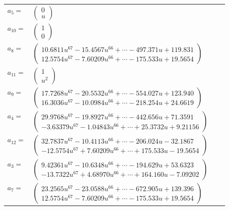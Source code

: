 \documentclass[1p]{elsarticle_modified}
\theoremstyle{definition}
\begin{document}
\begin{tabular}{m{7pt} m{180pt} m{7pt} m{180pt} }
\flushright $a_{5}=$&$\begin{pmatrix}0\\u\end{pmatrix}$ \\
\flushright $a_{10}=$&$\begin{pmatrix}1\\0\end{pmatrix}$ \\
\flushright $a_{8}=$&$\begin{pmatrix}10.6811 u^{67}-15.4567 u^{66}+\cdots-497.371 u+119.831\\12.5754 u^{67}-7.60209 u^{66}+\cdots-175.533 u+19.5654\end{pmatrix}$ \\
\flushright $a_{11}=$&$\begin{pmatrix}1\\u^2\end{pmatrix}$ \\
\flushright $a_{9}=$&$\begin{pmatrix}17.7268 u^{67}-20.5532 u^{66}+\cdots-554.027 u+123.940\\16.3036 u^{67}-10.0984 u^{66}+\cdots-218.254 u+24.6619\end{pmatrix}$ \\
\flushright $a_{4}=$&$\begin{pmatrix}29.9768 u^{67}-19.8927 u^{66}+\cdots-442.656 u+71.3591\\-3.63379 u^{67}-1.04843 u^{66}+\cdots+25.3732 u+9.21156\end{pmatrix}$ \\
\flushright $a_{12}=$&$\begin{pmatrix}32.7837 u^{67}-10.4113 u^{66}+\cdots-206.024 u-32.1867\\-12.5754 u^{67}+7.60209 u^{66}+\cdots+175.533 u-19.5654\end{pmatrix}$ \\
\flushright $a_{3}=$&$\begin{pmatrix}9.42361 u^{67}-10.6348 u^{66}+\cdots-194.629 u+53.6323\\-13.7322 u^{67}+4.68970 u^{66}+\cdots+164.160 u-7.09202\end{pmatrix}$ \\
\flushright $a_{7}=$&$\begin{pmatrix}23.2565 u^{67}-23.0588 u^{66}+\cdots-672.905 u+139.396\\12.5754 u^{67}-7.60209 u^{66}+\cdots-175.533 u+19.5654\end{pmatrix}$ \\

\end{tabular}
\end{document}
